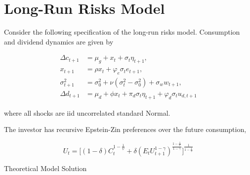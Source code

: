 \documentclass{article}
\begin{document}
\pagebreak


\section{Long-Run Risks Model}

Consider the following specification of the long-run risks model. Consumption and dividend dynamics are given by

\begin{align*}
\Delta c_{t+1} &= \mu_g + x_t + \sigma_t \eta_{t+1}, \\
x_{t+1} &= \rho x_t + \varphi_e \sigma_t e_{t+1}, \\
\sigma_{t+1}^2 &= \sigma_0^2 + \nu(\sigma_t^2 - \sigma_0^2) + \sigma_w w_{t+1},\\
\Delta d_{t+1} &= \mu_d + \phi x_t + \pi_d \sigma_t \eta_{t+1} + \varphi_d \sigma_t u_{d,t+1}
\end{align*}

where all shocks are iid uncorrelated standard Normal.

\bigskip

The investor has recursive Epstein-Zin preferences over the future consumption,

$$
U_t = \Bigg[(1-\delta)C_t^{1- \frac{1}{\psi}} + \delta (E_t U_{t+1}^{1 - \gamma})^{\frac{1-\frac{1}{\psi}}{1 - \gamma}} \Bigg]^{\frac{1}{1-\frac{1}{\psi}}}
$$

Theoretical Model Solution
\end{document}
